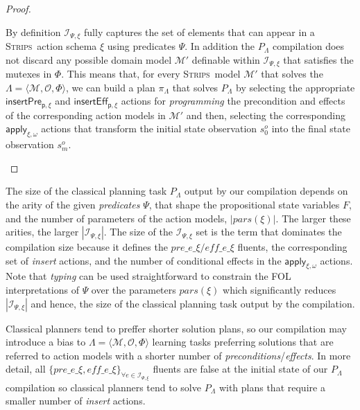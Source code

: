 \documentclass{article}
\newcommand{\tup}[1]{{\langle #1 \rangle}}
\newcommand{\strips}{\textsc{Strips}}
\begin{document}
\begin{proof}[Proof]
\begin{small}
By definition ${\mathcal I}_{\Psi,\xi}$ fully captures the set of elements that can appear in a \strips\ action schema $\xi$ using predicates $\Psi$. In addition the $P_{\Lambda}$ compilation does not discard any possible domain model $\mathcal{M}'$ definable within ${\mathcal I}_{\Psi,\xi}$ that satisfies the mutexes in $\Phi$. This means that, for every \strips\ model $\mathcal{M}'$ that solves the $\Lambda=\tup{\mathcal{M},{\mathcal O},\Phi}$, we can build a plan $\pi_{\Lambda}$ that solves $P_{\Lambda}$ by selecting the appropriate $\mathsf{insertPre_{p,\xi}}$ and $\mathsf{insertEff_{p,\xi}}$ actions for {\em programming} the precondition and effects of the corresponding action models in $\mathcal{M}'$ and then, selecting the corresponding $\mathsf{apply_{\xi,\omega}}$ actions that transform the initial state observation $s_0^o$ into the final state observation $s_m^o$.
\end{small}
\end{proof}

The size of the classical planning task $P_{\Lambda}$ output by our compilation depends on the arity of the given {\em predicates} $\Psi$, that shape the propositional state variables $F$, and the number of parameters of the action models, $|pars(\xi)|$. The larger these arities, the larger $|{\mathcal I}_{\Psi,\xi}|$. The size of the ${\mathcal I}_{\Psi,\xi}$ set is the term that dominates the compilation size because it defines the $pre\_e\_\xi/eff\_e\_\xi$ fluents, the corresponding set of {\em insert} actions, and the number of conditional effects in the $\mathsf{apply_{\xi,\omega}}$ actions. Note that {\em typing} can be used straightforward to constrain the FOL interpretations of $\Psi$ over the parameters $pars(\xi)$ which significantly reduces $|{\mathcal I}_{\Psi,\xi}|$ and hence, the size of the classical planning task output by the compilation.

Classical planners tend to preffer shorter solution plans, so our compilation may introduce a bias to $\Lambda=\tup{\mathcal{M},{\mathcal O},\Phi}$ learning tasks preferring solutions that are referred to action models with a shorter number of {\em preconditions}/{\em effects}. In more detail, all $\{pre\_e\_\xi, eff\_e\_\xi\}_{\forall e\in{\mathcal I}_{\Psi,\xi}}$ fluents are false at the initial state of our $P_\Lambda$ compilation so classical planners tend to solve $P_\Lambda$ with plans that require a smaller number of {\em insert} actions.
\end{document}
